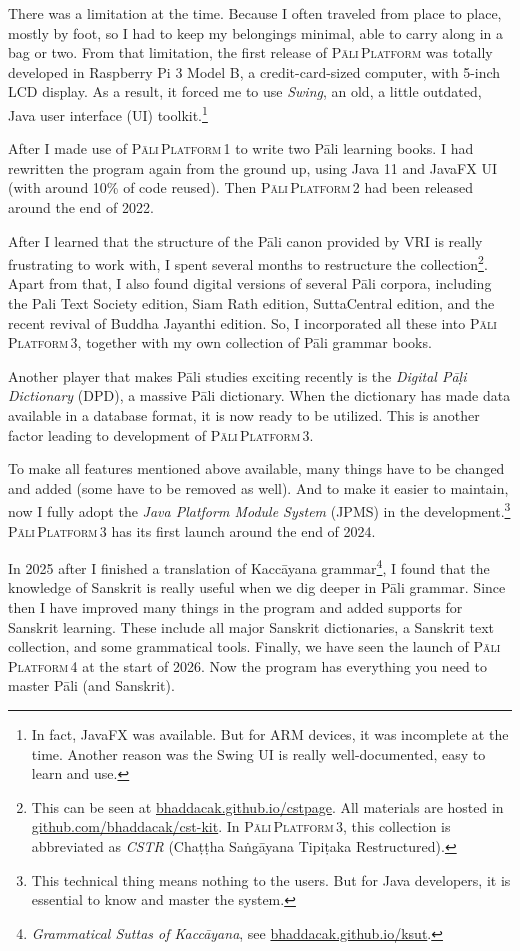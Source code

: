 There was a limitation at the time. Because I often traveled from place to place, mostly by foot, so I had to keep my belongings minimal, able to carry along in a bag or two. From that limitation, the first release of \textsc{Pāli\,Platform} was totally developed in Raspberry Pi 3 Model B, a credit-card-sized computer, with 5-inch LCD display. As a result, it forced me to use \emph{Swing}, an old, a little outdated, Java user interface (UI) toolkit.\footnote{In fact, JavaFX was available. But for ARM devices, it was incomplete at the time. Another reason was the Swing UI is really well-documented, easy to learn and use.}

After I made use of \textsc{Pāli\,Platform\,1} to write two Pāli learning books. I had rewritten the program again from the ground up, using Java 11 and JavaFX UI (with around 10\% of code reused). Then \textsc{Pāli\,Platform\,2} had been released around the end of 2022.

After I learned that the structure of the Pāli canon provided by VRI is really frustrating to work with, I spent several months to restructure the collection\footnote{This can be seen at \url{bhaddacak.github.io/cstpage}. All materials are hosted in \url{github.com/bhaddacak/cst-kit}. In \textsc{Pāli\,Platform\,3}, this collection is abbreviated as \emph{CSTR} (Chaṭṭha Saṅgāyana Tipiṭaka Restructured).}. Apart from that, I also found digital versions of several Pāli corpora, including the Pali Text Society edition, Siam Rath edition, SuttaCentral edition, and the recent revival of Buddha Jayanthi edition. So, I incorporated all these into \textsc{Pāli\,Platform\,3}, together with my own collection of Pāli grammar books.

Another player that makes Pāli studies exciting recently is the \emph{Digital Pāḷi Dictionary} (DPD), a massive Pāli dictionary. When the dictionary has made data available in a database format, it is now ready to be utilized. This is another factor leading to development of \textsc{Pāli\,Platform\,3}.

To make all features mentioned above available, many things have to be changed and added (some have to be removed as well). And to make it easier to maintain, now I fully adopt the \emph{Java Platform Module System} (JPMS) in the development.\footnote{This technical thing means nothing to the users. But for Java developers, it is essential to know and master the system.} \textsc{Pāli\,Platform\,3} has its first launch around the end of 2024.

In 2025 after I finished a translation of Kaccāyana grammar\footnote{\emph{Grammatical Suttas of Kaccāyana}, see \url{bhaddacak.github.io/ksut}.}, I found that the knowledge of Sanskrit is really useful when we dig deeper in Pāli grammar. Since then I have improved many things in the program and added supports for Sanskrit learning. These include all major Sanskrit dictionaries, a Sanskrit text collection, and some grammatical tools. Finally, we have seen the launch of \textsc{Pāli\,Platform\,4} at the start of 2026. Now the program has everything you need to master Pāli (and Sanskrit).

